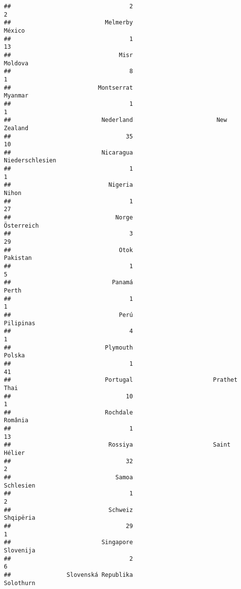 \documentclass[]{article}
\begin{document}
\begin{verbatim}
##                                  2                                  2 
##                           Melmerby                             México 
##                                  1                                 13 
##                               Misr                            Moldova 
##                                  8                                  1 
##                         Montserrat                            Myanmar 
##                                  1                                  1 
##                          Nederland                        New Zealand 
##                                 35                                 10 
##                          Nicaragua                    Niederschlesien 
##                                  1                                  1 
##                            Nigeria                              Nihon 
##                                  1                                 27 
##                              Norge                         Österreich 
##                                  3                                 29 
##                               Otok                           Pakistan 
##                                  1                                  5 
##                             Panamá                              Perth 
##                                  1                                  1 
##                               Perú                          Pilipinas 
##                                  4                                  1 
##                           Plymouth                             Polska 
##                                  1                                 41 
##                           Portugal                       Prathet Thai 
##                                 10                                  1 
##                           Rochdale                            România 
##                                  1                                 13 
##                            Rossiya                       Saint Hélier 
##                                 32                                  2 
##                              Samoa                          Schlesien 
##                                  1                                  2 
##                            Schweiz                          Shqipëria 
##                                 29                                  1 
##                          Singapore                          Slovenija 
##                                  2                                  6 
##                Slovenská Republika                          Solothurn 

\end{verbatim}
\end{document}
